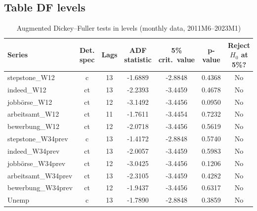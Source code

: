 \documentclass[12pt,a4paper]{article}
\begin{document}
\subsection{Table DF levels}
\begin{table}[htbp]
\centering
\caption{Augmented Dickey--Fuller tests in levels (monthly data, 2011M6--2023M1)}
\label{tab:adf_levels}
\begin{tabular}{lcccccc}
\hline\hline
Series & Det. spec & Lags & ADF statistic & 5\% crit.\ value & p-value & Reject $H_0$ at 5\%? \\
\hline
stepstone\_W12      & c  & 13 & -1.6889 & -2.8848 & 0.4368 & No \\
indeed\_W12         & ct & 13 & -2.2393 & -3.4459 & 0.4678 & No \\
jobbörse\_W12       & ct & 12 & -3.1492 & -3.4456 & 0.0950 & No \\
arbeitsamt\_W12     & ct & 11 & -1.7611 & -3.4454 & 0.7232 & No \\
bewerbung\_W12      & ct & 12 & -2.0718 & -3.4456 & 0.5619 & No \\
stepstone\_W34prev  & c  & 13 & -1.4172 & -2.8848 & 0.5740 & No \\
indeed\_W34prev     & ct & 13 & -2.0057 & -3.4459 & 0.5983 & No \\
jobbörse\_W34prev   & ct & 12 & -3.0425 & -3.4456 & 0.1206 & No \\
arbeitsamt\_W34prev & ct & 13 & -2.3105 & -3.4459 & 0.4282 & No \\
bewerbung\_W34prev  & ct & 12 & -1.9437 & -3.4456 & 0.6317 & No \\
Unemp               & c  & 13 & -1.7890 & -2.8848 & 0.3859 & No \\
\hline\hline
\end{tabular}
\end{table}
\end{document}
